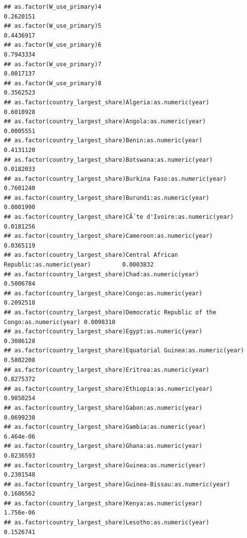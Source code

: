 \documentclass[
  a4paper,
]{article}
\begin{document}
\begin{verbatim}
## as.factor(W_use_primary)4                                                         0.2620151
## as.factor(W_use_primary)5                                                         0.4436917
## as.factor(W_use_primary)6                                                         0.7943334
## as.factor(W_use_primary)7                                                         0.0017137
## as.factor(W_use_primary)8                                                         0.3562523
## as.factor(country_largest_share)Algeria:as.numeric(year)                          0.6010928
## as.factor(country_largest_share)Angola:as.numeric(year)                           0.0005551
## as.factor(country_largest_share)Benin:as.numeric(year)                            0.4131120
## as.factor(country_largest_share)Botswana:as.numeric(year)                         0.0182033
## as.factor(country_largest_share)Burkina Faso:as.numeric(year)                     0.7601240
## as.factor(country_largest_share)Burundi:as.numeric(year)                          0.0001990
## as.factor(country_largest_share)CÃ´te d'Ivoire:as.numeric(year)                   0.0181256
## as.factor(country_largest_share)Cameroon:as.numeric(year)                         0.0365119
## as.factor(country_largest_share)Central African Republic:as.numeric(year)         0.0003832
## as.factor(country_largest_share)Chad:as.numeric(year)                             0.5006784
## as.factor(country_largest_share)Congo:as.numeric(year)                            0.2092518
## as.factor(country_largest_share)Democratic Republic of the Congo:as.numeric(year) 0.0098310
## as.factor(country_largest_share)Egypt:as.numeric(year)                            0.3086128
## as.factor(country_largest_share)Equatorial Guinea:as.numeric(year)                0.5802208
## as.factor(country_largest_share)Eritrea:as.numeric(year)                          0.8275372
## as.factor(country_largest_share)Ethiopia:as.numeric(year)                         0.9850254
## as.factor(country_largest_share)Gabon:as.numeric(year)                            0.0699230
## as.factor(country_largest_share)Gambia:as.numeric(year)                           6.464e-06
## as.factor(country_largest_share)Ghana:as.numeric(year)                            0.0236593
## as.factor(country_largest_share)Guinea:as.numeric(year)                           0.2301548
## as.factor(country_largest_share)Guinea-Bissau:as.numeric(year)                    0.1686562
## as.factor(country_largest_share)Kenya:as.numeric(year)                            1.756e-06
## as.factor(country_largest_share)Lesotho:as.numeric(year)                          0.1526741

\end{verbatim}
\end{document}
